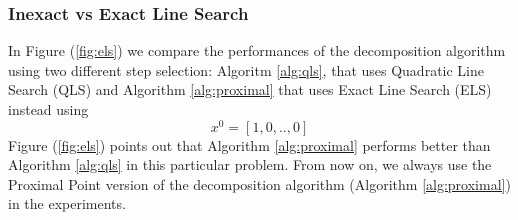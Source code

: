 \subsubsection{Inexact vs Exact Line Search}
In Figure (\ref{fig:els}) we compare the performances of the decomposition algorithm using two different step selection: Algoritm \ref{alg:qls}, that uses Quadratic Line Search (QLS) and Algorithm \ref{alg:proximal} that uses Exact Line Search (ELS) instead using
\begin{equation}\label{eq:sparsestarting}
x^0 = \left[1, 0, .., 0 \right]
\end{equation}
Figure (\ref{fig:els}) points out that Algorithm \ref{alg:proximal} performs better than Algorithm \ref{alg:qls} in this particular problem. From now on, we always use the Proximal Point version of the decomposition algorithm (Algorithm \ref{alg:proximal}) in the experiments.
